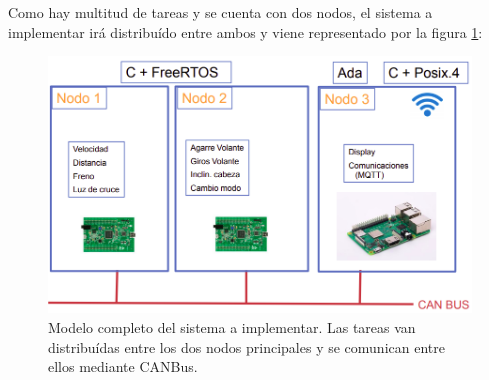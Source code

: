 Como hay multitud de tareas y se cuenta con dos nodos, el sistema a implementar irá
distribuído entre ambos y viene representado por la figura \ref{fig:system-full}:

\begin{figure}[H]
  \centering
  \includegraphics[width=.7\linewidth]{pictures/system-full.png}
  \caption{Modelo completo del sistema a implementar. Las tareas van distribuídas entre
    los dos nodos principales y se comunican entre ellos mediante CANBus.}
  \label{fig:system-full}
\end{figure}